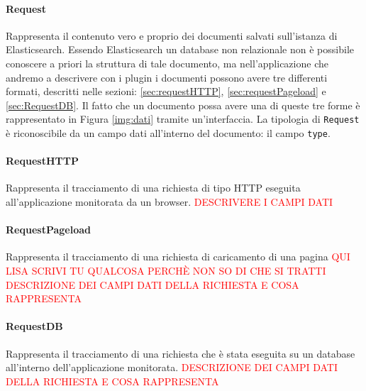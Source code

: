 \paragraph{Request} \Spazio
Rappresenta il contenuto vero e proprio dei documenti salvati sull'istanza di Elasticsearch. Essendo Elasticsearch un database non relazionale non è possibile conoscere a priori la struttura di tale documento, ma nell'applicazione che andremo a descrivere con i plugin i documenti possono avere tre differenti formati, descritti nelle sezioni: \ref{sec:requestHTTP}, \ref{sec:requestPageload} e \ref{sec:RequestDB}. Il fatto che un documento possa avere una di queste tre forme è rappresentato in Figura \ref{img:dati} tramite un'interfaccia. La tipologia di \texttt{Request} è riconoscibile da un campo dati all'interno del documento: il campo \texttt{type}. 
\paragraph{RequestHTTP} \Spazio
\label{sec:requestHTTP}
Rappresenta il tracciamento di una richiesta di tipo HTTP eseguita all'applicazione monitorata da un browser.
\textcolor{red}{DESCRIVERE I CAMPI DATI}

\paragraph{RequestPageload}\Spazio
\label{sec:requestPageload}
Rappresenta il tracciamento di una richiesta di caricamento di una pagina \textcolor{red}{QUI LISA SCRIVI TU QUALCOSA PERCHÈ NON SO DI CHE SI TRATTI}
\textcolor{red}{DESCRIZIONE DEI CAMPI DATI DELLA RICHIESTA E COSA RAPPRESENTA}

\paragraph{RequestDB}\Spazio
\label{sec:RequestDB}
Rappresenta il tracciamento di una richiesta che è stata eseguita su un database all'interno dell'applicazione monitorata. 
\textcolor{red}{DESCRIZIONE DEI CAMPI DATI DELLA RICHIESTA E COSA RAPPRESENTA}

